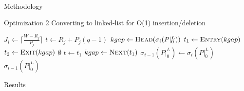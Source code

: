 \documentclass{article}
\begin{document}
\begin{section}{Methodology}
  \begin{subsection}{Optimization 2}
    Converting to linked-list for O(1) insertion/deletion
    \begin{algorithm}[H]
      \caption{Gap-Tranformation Algorithm Optimization 2: No Zero Gaps Reinserted, Linked List}\label{gapxfrm2}
      \begin{algorithmic}[2]
          \State $J_{i} \gets \lceil\frac{W - R_{j}}{P_{j}}\rceil$
            \State $t \gets R_{j} + P_{j}(q-1)$
            \State $kgap \gets \Call{Head}{\sigma_{i}(P|_{0}^{L})}$
            \State $t_{1} \gets \Call{Entry}{kgap}$
            \State $t_{2} \gets \Call{Exit}{kgap}$
                \State \Return $\emptyset$
              \EndIf
                \State $t \gets t_{1}$
              \EndIf
                    \State {$[t_{1},t_{2}) \gets [t_{1},t)$}
                  \Else
                    \State {\Call{Splice-Out}{$\sigma_{i}(P|_{0}^{L}), [t_{1},t_{2})$}}
                  \EndIf
                    \ExitWhile
                  \EndIf
                \EndIf
                    \State {$[t_{1},t_{2}) \gets [t + C_{j},t_{2})$}
                      \State \Call{Splice-In}{$\sigma_{i}(P|_{0}^{L}), [t_{1},t)$}
                    \EndIf
                  \ExitWhile
                \EndIf
              \EndIf
                \State $kgap \gets \Call{Next}{t_{1}}$
              \EndIf
            \EndWhile
          \EndFor
          \State $\sigma_{i-1}(P|_{0}^{L}) \gets \sigma_{i}(P|_{0}^{L})$
          \State \Return $\sigma_{i-1}(P|_{0}^{L})$
        \EndFunction
      \end{algorithmic}
      \end{algorithm}
  \end{subsection}

\end{section}

\begin{section}{Results}
\end{section}
\end{document}
